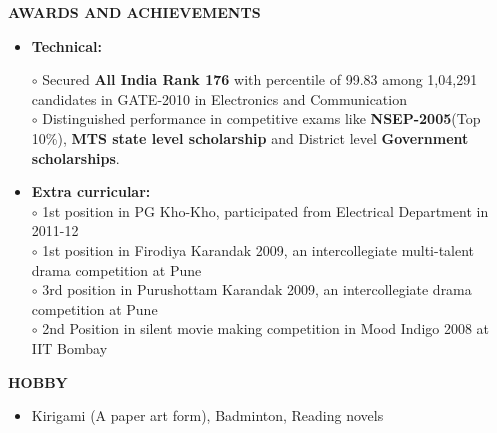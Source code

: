 \documentclass[a4paper,10pt]{article}
\begin{document}
 \colorbox{titleColor}{\parbox{6.5in}{\textbf{AWARDS AND ACHIEVEMENTS}}}

 \begin{itemize}
 
  \item \textbf{{Technical:}}

  $\circ$ Secured  \textbf{All India Rank 176} with percentile of 99.83 among 1,04,291 candidates in GATE-2010 in Electronics and Communication\\
  $\circ$ Distinguished performance in competitive exams like \textbf{NSEP-2005}(Top 10\%), \textbf{MTS state level scholarship} and District level \textbf{Government scholarships}.
 
  \item \textbf{{Extra curricular:}}\\
  $\circ$ 1st position in PG Kho-Kho, participated from Electrical Department in 2011-12\\
  $\circ$ 1st position in Firodiya Karandak 2009, an intercollegiate multi-talent drama competition at Pune\\
  $\circ$ 3rd position in Purushottam Karandak 2009, an intercollegiate drama competition at Pune\\
  $\circ$ 2nd Position in silent movie making competition in Mood Indigo 2008 at IIT Bombay 
  
  


 \end{itemize}

 \colorbox{titleColor}{\parbox{6.5in}{\textbf{HOBBY}}}

 \begin{itemize}
  \setlength{\itemsep}{1pt}
  \item Kirigami (A paper art form), Badminton, Reading novels
 \end{itemize}
\end{document}
